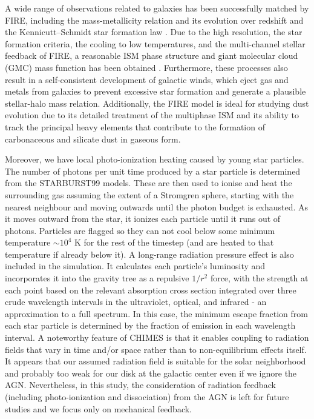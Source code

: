 \documentclass[fleqn,usenatbib]{mnras}
\begin{document}
A wide range of observations related to galaxies has been successfully matched by FIRE, including the mass-metallicity relation and its evolution over redshift \citep{Ma2016} and the Kennicutt–Schmidt star formation law \citep{Orr2018}. Due to the high resolution, the star formation criteria, the cooling to low temperatures, and the multi-channel stellar feedback of FIRE, a reasonable ISM phase structure and giant molecular cloud (GMC) mass function has been obtained \citep{Benincasa2020}. Furthermore, these processes also result in a self-consistent development of galactic winds, which eject gas \citep{Muratov2015, Angles-alcazar2017} and metals \citep{Muratov2017, Hafen2019,Pandya2021} from galaxies to prevent excessive star formation and generate a plausible stellar-halo mass relation.
Additionally, the FIRE model is ideal for studying dust evolution due to its detailed treatment of the multiphase ISM and its ability to track the principal heavy elements that contribute to the formation of carbonaceous and silicate dust in gaseous form.

Moreover, we have local photo-ionization heating caused by young star particles. 
The number of photons per unit time produced by a star particle is determined from the STARBURST99 models. These are then used to ionise and heat the surrounding gas assuming the extent of a Stromgren sphere, starting with the nearest neighbour and moving outwards until the photon budget is exhausted. As it moves outward from the star, it ionizes each particle until it runs out of photons. Particles are flagged so they can not  cool below some minimum temperature $\sim10^4$ K for the rest of the timestep (and are heated to that temperature if already below it).
A long-range radiation pressure effect is also included in the simulation. 
It calculates each particle's luminosity and incorporates it into the gravity tree as a repulsive $1/r^2$ force, with the strength at each point based on the relevant absorption cross section integrated over three crude wavelength intervals in the ultraviolet, optical, and infrared - an approximation to a full spectrum. In this case, the minimum escape fraction from each star particle is determined by the fraction of emission in each wavelength interval. A noteworthy feature of CHIMES is that it enables coupling to radiation fields that vary in time and/or space rather than to non-equilibrium effects itself. It appears that our assumed radiation field is suitable for the solar neighborhood and probably too weak for our disk at the galactic center even if we ignore the AGN.
Nevertheless, in this study, the consideration of radiation feedback (including photo-ionization and dissociation) from the AGN is left for future studies and we focus only on mechanical feedback.
 
\end{document}
